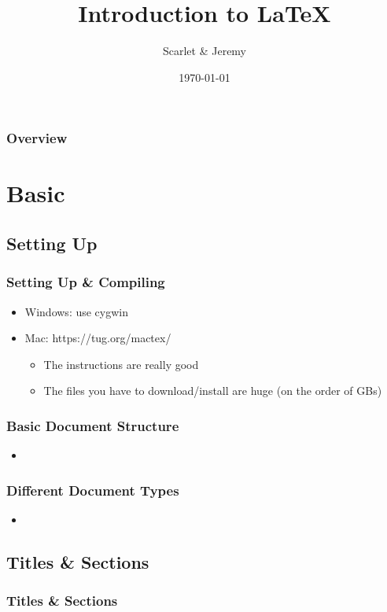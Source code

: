 \documentclass{beamer}
\title[Intro to \LaTeX]{Introduction to \LaTeX}
\author{Scarlet \& Jeremy}
\institute[Cornell University]{
Cornell University \\
\medskip
\textit{hy323 \& jlf248}
}
\date{\today}
\begin{document}
\begin{frame}
  \titlepage
\end{frame}

\begin{frame}
  \frametitle{Overview}
  \tableofcontents
\end{frame}

\section{Basic}

\subsection{Setting Up}
\begin{frame}[fragile]
  \frametitle{Setting Up \& Compiling}
    \begin{itemize}
      \item Windows: use cygwin
      \item Mac: https://tug.org/mactex/
        \begin{itemize}
          \item The instructions are really good
          \item The files you have to download/install are huge (on the order of GBs)
        \end{itemize}
    \end{itemize}
\end{frame}
\begin{frame}[fragile]
  \frametitle{Basic Document Structure}
    \begin{itemize}
      \item
    \end{itemize}
\end{frame}
\begin{frame}[fragile]
  \frametitle{Different Document Types}
    \begin{itemize}
      \item
    \end{itemize}
\end{frame}


\subsection{Titles \& Sections}
\begin{frame}
	\frametitle{Titles \& Sections}
\end{frame}
\end{document}
